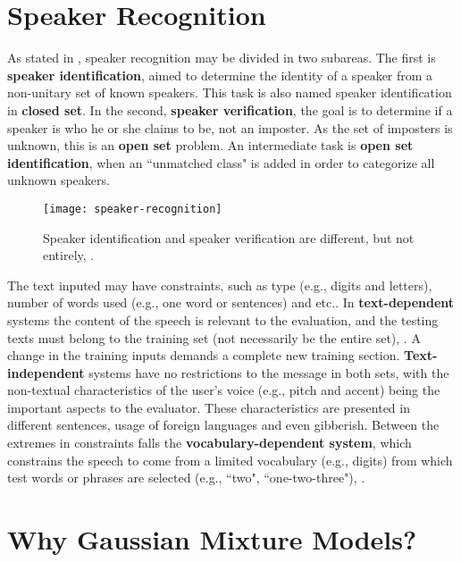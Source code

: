 \section{Speaker Recognition}
\label{sec:speaker-recognition}

As stated in , speaker recognition may be divided in two subareas. The first is \textbf{speaker identification}, aimed to determine the identity of a speaker from a non-unitary set of known speakers. This task is also named speaker identification in \textbf{closed set}. In the second, \textbf{speaker verification}, the goal is to determine if a speaker is who he or she claims to be, not an imposter. As the set of imposters is unknown, this is an \textbf{open set} problem. An intermediate task is \textbf{open set identification}, when an ``unmatched class" is added in order to categorize all unknown speakers.

\begin{figure}[ht]
    \centering
    \texttt{[image: speaker-recognition]}
    \caption{Speaker identification and speaker verification are different, but not entirely, .}
    \label{fig:speaker-recognition}
\end{figure}

The text inputed may have constraints, such as type (e.g., digits and letters), number of words used (e.g., one word or sentences) and etc.. In \textbf{text-dependent} systems the content of the speech is relevant to the evaluation, and the testing texts must belong to the training set (not necessarily be the entire set), . A change in the training inputs demands a complete new training section. \textbf{Text-independent} systems have no restrictions to the message in both sets, with the non-textual characteristics of the user's voice (e.g., pitch and accent) being the important aspects to the evaluator. These characteristics are presented in different sentences, usage of foreign languages and even gibberish. Between the extremes in constraints falls the \textbf{vocabulary-dependent system}, which constrains the speech to come from a limited vocabulary (e.g., digits) from which test words or phrases are selected (e.g., ``two", ``one-two-three"), .

\section{Why Gaussian Mixture Models?}

